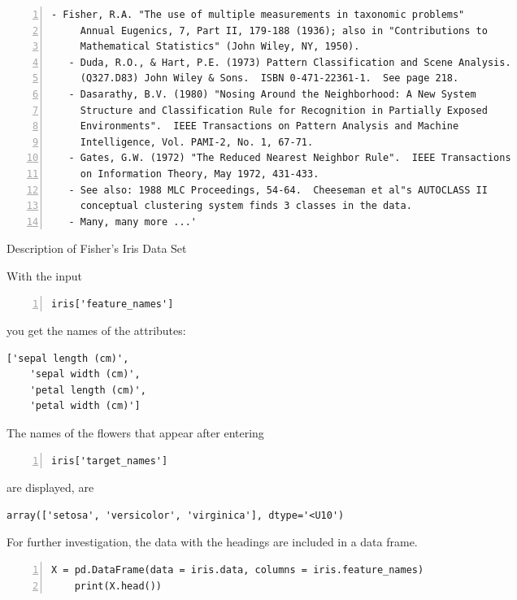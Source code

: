 \begin{code}
\begin{lstlisting}[language=MyPython, numbers=left]
   - Fisher, R.A. "The use of multiple measurements in taxonomic problems"
     Annual Eugenics, 7, Part II, 179-188 (1936); also in "Contributions to
     Mathematical Statistics" (John Wiley, NY, 1950).
   - Duda, R.O., & Hart, P.E. (1973) Pattern Classification and Scene Analysis.
     (Q327.D83) John Wiley & Sons.  ISBN 0-471-22361-1.  See page 218.
   - Dasarathy, B.V. (1980) "Nosing Around the Neighborhood: A New System
     Structure and Classification Rule for Recognition in Partially Exposed
     Environments".  IEEE Transactions on Pattern Analysis and Machine
     Intelligence, Vol. PAMI-2, No. 1, 67-71.
   - Gates, G.W. (1972) "The Reduced Nearest Neighbor Rule".  IEEE Transactions
     on Information Theory, May 1972, 431-433.
   - See also: 1988 MLC Proceedings, 54-64.  Cheeseman et al"s AUTOCLASS II
     conceptual clustering system finds 3 classes in the data.
   - Many, many more ...'
\end{lstlisting}
\caption{Description of Fisher's Iris Data Set}
\end{code}

With the input

\begin{lstlisting}[language=MyPython, numbers=left]
    iris['feature_names']
\end{lstlisting}

you get the names of the attributes:

\begin{lstlisting}[numbers=none]
    ['sepal length (cm)',
    'sepal width (cm)',
    'petal length (cm)',
    'petal width (cm)']
\end{lstlisting}

The names of the flowers that appear after entering

\begin{lstlisting}[language=MyPython, numbers=left]
    iris['target_names']
\end{lstlisting}

are displayed, are

\begin{lstlisting}[numbers=none]
    array(['setosa', 'versicolor', 'virginica'], dtype='<U10')
\end{lstlisting}

For further investigation, the data with the headings are included in a data frame.

\begin{lstlisting}[language=MyPython, numbers=left]
    X = pd.DataFrame(data = iris.data, columns = iris.feature_names)
    print(X.head())
\end{lstlisting}


